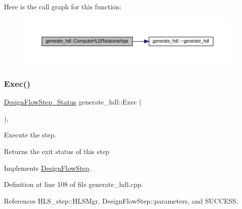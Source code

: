Here is the call graph for this function\+:
\nopagebreak
\begin{figure}[H]
\begin{center}
\leavevmode
\includegraphics[width=350pt]{d4/d67/classgenerate__hdl_a87b4ff40c6f91b64283253b1c1122c8f_cgraph}
\end{center}
\end{figure}
\mbox{\label{classgenerate__hdl_a3d6fb722c230dc38b6c90646f59c79c2}} 
\subsubsection{\texorpdfstring{Exec()}{Exec()}}
{\footnotesize\ttfamily \hyperlink{design__flow__step_8hpp_afb1f0d73069c26076b8d31dbc8ebecdf}{Design\+Flow\+Step\+\_\+\+Status} generate\+\_\+hdl\+::\+Exec (\begin{DoxyParamCaption}{ }\end{DoxyParamCaption})\hspace{0.3cm}{\ttfamily [override]}, {\ttfamily [virtual]}}



Execute the step. 

\begin{DoxyReturn}{Returns}
the exit status of this step 
\end{DoxyReturn}


Implements \hyperlink{classDesignFlowStep_a77d7e38493016766098711ea24f60b89}{Design\+Flow\+Step}.



Definition at line 108 of file generate\+\_\+hdl.\+cpp.



References H\+L\+S\+\_\+step\+::\+H\+L\+S\+Mgr, Design\+Flow\+Step\+::parameters, and S\+U\+C\+C\+E\+SS.

\mbox{\label{classgenerate__hdl_a6b5a0a9f67703606268a1eccafc389aa}} 
